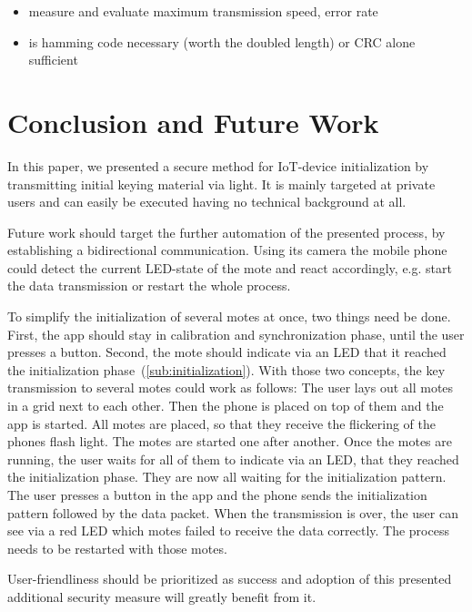 \documentclass{sig-alternate} %
\begin{document}
\begin{itemize}
	\item measure and evaluate maximum transmission speed, error rate
	\item is hamming code necessary (worth the doubled length) or CRC alone sufficient
\end{itemize}



\section{Conclusion and Future Work}
\label{sec:future_work}

In this paper, we presented a secure method for IoT-device initialization by transmitting initial keying material via light.
It is mainly targeted at private users and can easily be executed having no technical background at all.

Future work should target the further automation of the presented process, by establishing a bidirectional communication.
Using its camera the mobile phone could detect the current LED-state of the mote and react accordingly, e.g. start the data transmission or restart the whole process.

To simplify the initialization of several motes at once, two things need be done.
First, the app should stay in calibration and synchronization phase, until the user presses a button.
Second, the mote should indicate via an LED that it reached the initialization phase~(\ref{sub:initialization}).
With those two concepts, the key transmission to several motes could work as follows:
The user lays out all motes in a grid next to each other.
Then the phone is placed on top of them and the app is started.
All motes are placed, so that they receive the flickering of the phones flash light.
The motes are started one after another.
Once the motes are running, the user waits for all of them to indicate via an LED, that they reached the initialization phase.
They are now all waiting for the initialization pattern.
The user presses a button in the app and the phone sends the initialization pattern followed by the data packet.
When the transmission is over, the user can see via a red LED which motes failed to receive the data correctly.
The process needs to be restarted with those motes.


User-friendliness should be prioritized as success and adoption of this presented additional security measure will greatly benefit from it.




\end{document}
